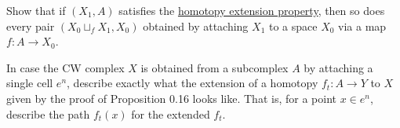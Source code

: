 	\begin{exercise}[Hatcher 0.28]
		Show that if $(X_1,A)$ satisfies the \hyperref[def:homotopy-extension-property]{homotopy extension property}, then so does every pair $(X_0 \sqcup_f X_1,X_0)$ obtained by attaching $X_1$ to a space $X_0$ via a map $f: A \to X_0$.
	\end{exercise}

	\begin{exercise}[Hatcher 0.29]
		In case the CW complex $X$ is obtained from a subcomplex $A$ by attaching a single cell $e^n$, describe exactly what the extension of a homotopy $f_t: A \to Y$ to $X$ given by the proof of Proposition 0.16 looks like. That is, for a point $x \in e^n$, describe the path $f_t(x)$ for the extended $f_t$.
	\end{exercise}

